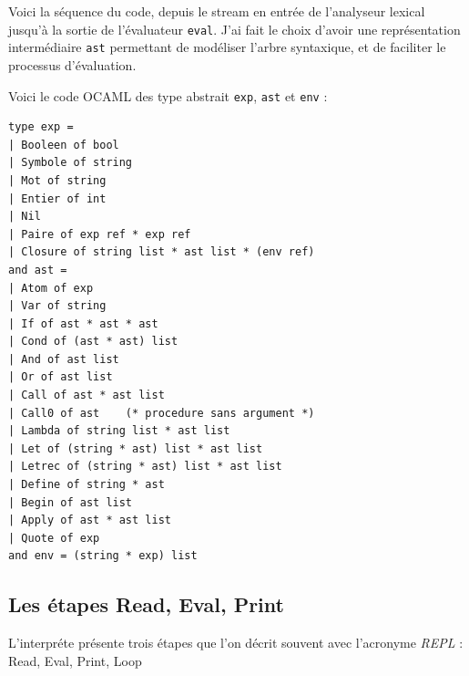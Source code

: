 \documentclass[11pt]{book}
\begin{document}
Voici la séquence du code, depuis le stream en entrée de l'analyseur lexical jusqu'à la sortie de l'évaluateur \verb+eval+.
J'ai  fait le choix d'avoir une représentation intermédiaire \verb+ast+ permettant de modéliser l'arbre syntaxique, et de faciliter
le processus d'évaluation.
\begin{center}
\end{center}


Voici le code OCAML des type abstrait \verb+exp+, \verb+ast+ et \verb+env+ :

\begin{Verbatim}
type exp =
| Booleen of bool
| Symbole of string
| Mot of string
| Entier of int
| Nil
| Paire of exp ref * exp ref
| Closure of string list * ast list * (env ref)
and ast =
| Atom of exp
| Var of string
| If of ast * ast * ast
| Cond of (ast * ast) list
| And of ast list
| Or of ast list
| Call of ast * ast list
| Call0 of ast    (* procedure sans argument *)
| Lambda of string list * ast list   
| Let of (string * ast) list * ast list
| Letrec of (string * ast) list * ast list
| Define of string * ast
| Begin of ast list
| Apply of ast * ast list
| Quote of exp
and env = (string * exp) list
  \end{Verbatim}


\subsection{Les étapes Read, Eval, Print}
L'interpr\'{e}te pr\'{e}sente trois \'{e}tapes que l'on d\'{e}crit souvent avec l'acronyme \textit{REPL} :
Read, Eval, Print, Loop
\end{document}

